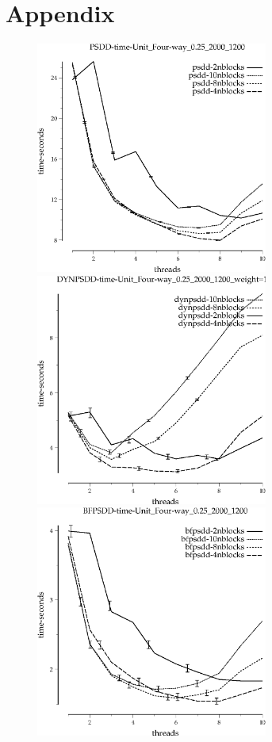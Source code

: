 \documentclass{article}
\begin{document}
\section{Appendix}
\begin{figure}[h!]
\includegraphics[width=3in]{../graphs/grid_unit_four-way_0.25_2000_1200/PSDD-time-Unit_Four-way_0.25_2000_1200.eps}
\includegraphics[width=3in]{../graphs/grid_unit_four-way_0.25_2000_1200/DYNPSDD-time-Unit_Four-way_0.25_2000_1200_weight=1.5.eps}
\includegraphics[width=3in]{../graphs/grid_unit_four-way_0.25_2000_1200/BFPSDD-time-Unit_Four-way_0.25_2000_1200.eps}

\end{figure}
\end{document}
